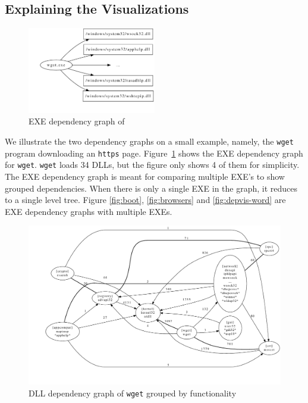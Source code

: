 \subsection{Explaining the Visualizations}

\begin{figure}[tbh]
\centering
\includegraphics[width=0.5\textwidth]{depvis/wget-exe-split.pdf}
\caption{EXE dependency graph of }
\label{fig:wget-exe-split}
\end{figure}

We illustrate the two dependency graphs on a small example, namely, the
{\tt wget} program downloading an {\tt https} page.
Figure~\ref{fig:wget-exe-split} shows the EXE dependency graph for {\tt wget}.
{\tt wget} loads 34 DLLs,
but the figure only shows 4 of them for simplicity.
The EXE dependency graph is meant for comparing multiple EXE's to show
grouped dependencies.
When there is only a single EXE in the graph, it reduces to a single level
tree.
Figure \ref{fig:boot}, \ref{fig:browsers} and \ref{fig:depvis-word}
are EXE dependency graphs with multiple EXEs.

\begin{figure}[thb]
\centering
\includegraphics[width=1.0\columnwidth]{depvis/wget-function.pdf}
\caption{DLL dependency graph of {\tt wget} grouped by functionality}
\label{fig:wget-function}
\end{figure}

